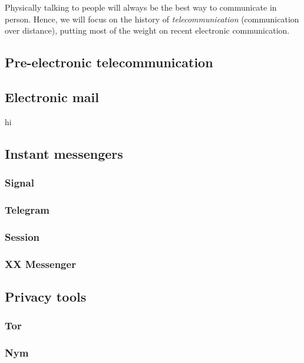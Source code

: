 \documentclass[sigconf, nonacm, balance=false, natbib=false]{acmart}
\begin{document}
Physically talking to people will always be the best way to communicate in person. Hence, we will focus on the history of \textit{telecommunication} (communication over distance), putting most of the weight on recent electronic communication.

\subsection{Pre-electronic telecommunication}

\subsection{Electronic mail}

hi

\subsection{Instant messengers}

\subsubsection{Signal}

\subsubsection{Telegram}

\subsubsection{Session}

\subsubsection{XX Messenger}

\subsection{Privacy tools}

\subsubsection{Tor}

\subsubsection{Nym}


\printbibliography
\end{document}
